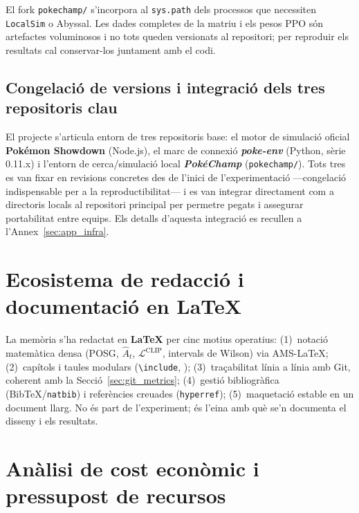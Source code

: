 El fork \texttt{pokechamp/} s'incorpora al \texttt{sys.path} dels processos que necessiten \texttt{LocalSim} o Abyssal. Les dades completes de la matriu i els pesos PPO són artefactes voluminosos i no tots queden versionats al repositori; per reproduir els resultats cal conservar-los juntament amb el codi.

\subsection{Congelació de versions i integració dels tres repositoris clau}

El projecte s'articula entorn de tres repositoris base: el motor de simulació oficial \textbf{Pokémon Showdown} (Node.js), el marc de connexió \textbf{\textit{poke-env}} (Python, sèrie 0.11.x) i l'entorn de cerca/simulació local \textbf{\textit{PokéChamp}} (\texttt{pokechamp/}). Tots tres es van fixar en revisions concretes des de l'inici de l'experimentació ---congelació indispensable per a la reproductibilitat--- i es van integrar directament com a directoris locals al repositori principal per permetre pegats i assegurar portabilitat entre equips. Els detalls d'aquesta integració es recullen a l'Annex~\ref{sec:app_infra}.

\section{Ecosistema de redacció i documentació en \LaTeX}
\label{sec:perque_latex}

La memòria s'ha redactat en \textbf{\LaTeX{}} per cinc motius operatius: (1)~notació matemàtica densa (POSG, $\hat{A}_t$, $\mathcal{L}^{\mathrm{CLIP}}$, intervals de Wilson) via AMS-\LaTeX{}; (2)~capítols i taules modulars (\texttt{\textbackslash include}, ); (3)~traçabilitat línia a línia amb Git, coherent amb la Secció~\ref{sec:git_metrics}; (4)~gestió bibliogràfica (BibTeX/\texttt{natbib}) i referències creuades (\texttt{hyperref}); (5)~maquetació estable en un document llarg. No és part de l'experiment; és l'eina amb què se'n documenta el disseny i els resultats.

\section{Anàlisi de cost econòmic i pressupost de recursos}
\label{sec:cost_economic}

